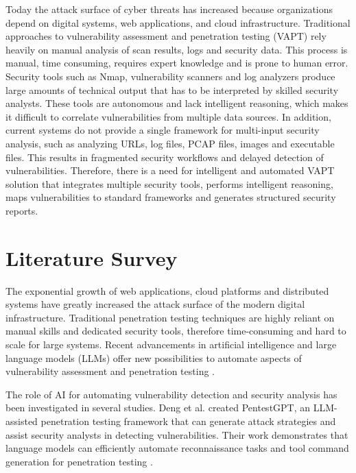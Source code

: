 \documentclass[journal]{IEEEtran}
\begin{document}
Today the attack surface of cyber threats has increased because organizations depend on digital systems, web applications, and cloud infrastructure. Traditional approaches to vulnerability assessment and penetration testing (VAPT) rely heavily on manual analysis of scan results, logs and security data. This process is manual, time consuming, requires expert knowledge and is prone to human error. Security tools such as Nmap, vulnerability scanners and log analyzers produce large amounts of technical output that has to be interpreted by skilled security analysts. These tools are autonomous and lack intelligent reasoning, which makes it difficult to correlate vulnerabilities from multiple data sources. In addition, current systems do not provide a single framework for multi-input security analysis, such as analyzing URLs, log files, PCAP files, images and executable files. This results in fragmented security workflows and delayed detection of vulnerabilities. Therefore, there is a need for intelligent and automated VAPT solution that integrates multiple security tools, performs intelligent reasoning, maps vulnerabilities to standard frameworks and generates structured security reports.


\section{Literature Survey}
The exponential growth of web applications, cloud platforms and distributed systems have greatly increased the attack surface of the modern digital infrastructure. Traditional penetration testing techniques are highly reliant on manual skills and dedicated security tools, therefore time-consuming and hard to scale for large systems. Recent advancements in artificial intelligence and large language models (LLMs) offer new possibilities to automate aspects of vulnerability assessment and penetration testing \cite{sharma2024ideation,ferrag2024generative}.

The role of AI for automating vulnerability detection and security analysis has been investigated in several studies. Deng et al. created PentestGPT, an LLM-assisted penetration testing framework that can generate attack strategies and assist security analysts in detecting vulnerabilities. Their work demonstrates that language models can efficiently automate reconnaissance tasks and tool command generation for penetration testing \cite{deng2024pentestgpt}.
\end{document}
